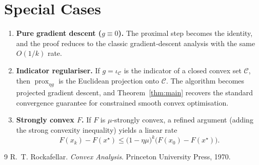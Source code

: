 \documentclass{article}
\newcommand{\prox}{\operatorname{prox}}
\begin{document}
\section*{Special Cases}
\begin{enumerate}[label=\alph*)]
\item \textbf{Pure gradient descent ($g\equiv0$).} The proximal step becomes the identity, and the proof reduces to the classic gradient‑descent analysis with the same $O(1/k)$ rate.
\item \textbf{Indicator regulariser.} If $g=\iota_{\mathcal{C}}$ is the indicator of a closed convex set $\mathcal{C}$, then $\prox_{\eta g}$ is the Euclidean projection onto $\mathcal{C}$. The algorithm becomes projected gradient descent, and Theorem~\ref{thm:main} recovers the standard convergence guarantee for constrained smooth convex optimisation.
\item \textbf{Strongly convex $F$.} If $F$ is $\mu$‑strongly convex, a refined argument (adding the strong convexity inequality) yields a linear rate
\[
F(x_{k})-F(x^{\star})\le \bigl(1-\eta\mu\bigr)^{k}\bigl(F(x_{0})-F(x^{\star})\bigr).
\]
\end{enumerate}


\begin{thebibliography}{9}
R.~T. Rockafellar.
\newblock \emph{Convex Analysis}.
\newblock Princeton University Press, 1970.
\end{thebibliography}
\end{document}
